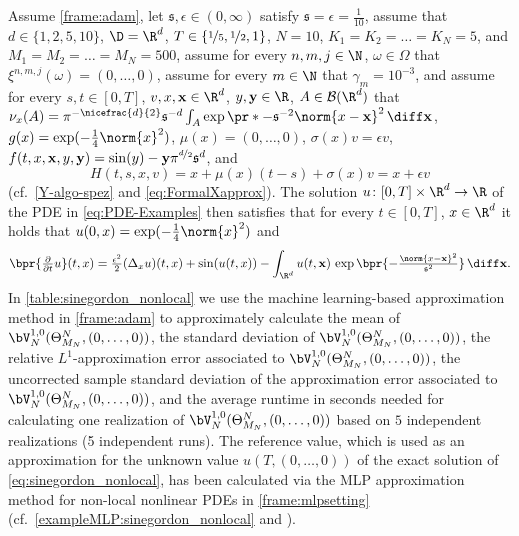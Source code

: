 Assume 
	\cref{frame:adam},
let
	$\mathfrak s,\epsilon\in(0,\infty)$
satisfy
	$\mathfrak{s} = \epsilon =\tfrac{1}{10}$,
assume that
	$d\in\{1,2,5,10\}$,
	$\D = \R^d$,
	$T\in\{\nicefrac{1}{5},\nicefrac{1}{2},1\}$,
	$N=10$,
	$K_1 = K_2 = \ldots = K_N= 5$, and
	$M_1 = M_2 = \ldots = M_N = 500$,
assume 
	for every 
		$n,m,j\in \N$, 
		$\omega \in \Omega$
	that 
		$\xi^{n,m,j}(\omega)=(0,\dots,0)$,
assume 
	for every 
		$m \in \N$
	that
		$\gamma_m = 10^{-3}$,
and assume 
	for every 
		$s,t \in [0,T]$, 
		$v,x,\mathbf{x}%
		\in \R^d$, 
		$y,\mathbf{y} \in \R$,
		$A \in \mathcal{B}(\R^d)$
	that
		$\nu_x(A) = \pi^{-\nicefrac{d}{2}}\mathfrak{s}^{-d}\int_A \exp\pr*{-\mathfrak{s}^{-2}\norm{x - \mathbf{x}}^2}\,\diff\mathbf{x}$,
		$g(x)= \exp (-\tfrac{1}{4}\norm{x}^2)$,
		$\mu(x)=(0,\dots,0)$,
		$\sigma(x) v = \epsilon v$, 
		$f(t,x,\mathbf{x},y,\mathbf{y}%
		)=  \sin(y) - \mathbf{y} \pi^{\nicefrac{d}{2}}\mathfrak{s}^d$, 
		and
	\begin{equation}
		\label{eq:Hsinegordon}
		H(t,s,x,v)
		=
		x + \mu(x)(t-s)+ \sigma(x)v
		=
		x+\epsilon v
	\end{equation}
	(cf.\ \eqref{Y-algo-spez} and \eqref{eq:FormalXapprox}).
The solution 
	$u\colon[0,T]\times \R^d \to \R$ 
	of the PDE in \eqref{eq:PDE-Examples} then satisfies that 
		for every
			$t\in [0,T]$, 
			$x\in\R^d$ 
		it holds that 
			$u(0,x)=\exp (-\tfrac{1}{4}\norm{x}^2)$ and
		\begin{equation}
			\label{eq:sinegordon_nonlocal}
			\bpr{\tfrac{\partial}{\partial t}u}(t,x)
			=
			\tfrac{\epsilon^2}{2}(\Delta_x u)(t,x) + \sin ( u(t,x) ) - \int_{\R^d} u(t,\mathbf{x})\, \exp\bpr{-\tfrac{\norm{x-\mathbf{x}}^2}{\mathfrak{s}^2}}\,\diff\mathbf{x} 
			.
		\end{equation}
%
%
In \cref{table:sinegordon_nonlocal} 
we use the machine learning-based approximation method
in \cref{frame:adam} 
to approximately calculate
the mean of %
$
\bV^{1,0}_N(\Theta^N_{M_N},\allowbreak (0,\ldots,0))
$,
the standard deviation of %
$
\bV^{1,0}_N(\Theta^N_{M_N},\allowbreak (0,\ldots,0))
$,
the relative $ L^1 $-approximation error associated to %
$
\bV^{1,0}_N(\Theta^N_{M_N},\allowbreak (0,\ldots,\allowbreak 0))
$,
the uncorrected sample standard deviation of the approximation error associated to %
$
\bV^{1,0}_N(\Theta^N_{M_N},\allowbreak (0,\ldots,0))
$,
and the average runtime in seconds needed for calculating one realization of $
\bV^{1,0}_N(\Theta^N_{M_N},\allowbreak (0,\ldots,0))
$
%
based on $5$ independent realizations (5 independent runs).
%
The reference value, which is used as an approximation for the unknown value $u(T,(0,\ldots,0))$ of the exact solution of \eqref{eq:sinegordon_nonlocal},  has been calculated via the MLP approximation method for non-local nonlinear PDEs in \cref{frame:mlpsetting} (cf.~\cref{exampleMLP:sinegordon_nonlocal} and \cite[Remark~3.3]{Beck2017a}).

